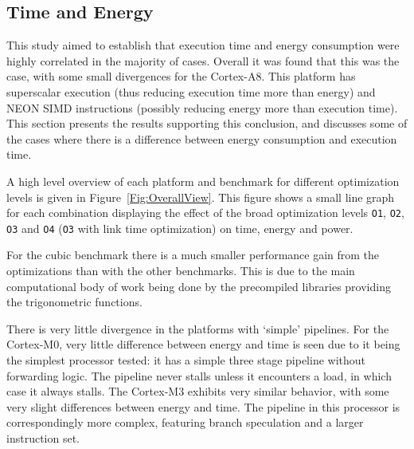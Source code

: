 \documentclass[twocolumn]{article}
\begin{document}
\subsection*{Time and Energy}

This study aimed to establish that execution time and energy consumption were highly correlated in the majority of cases. Overall it was found that this was the case, with some small divergences for the Cortex-A8. This platform has superscalar execution (thus reducing execution time more than energy) and NEON SIMD instructions (possibly reducing energy more than execution time). This section presents the results supporting this conclusion, and discusses some of the cases where there is a difference between energy consumption and execution time.

A high level overview of each platform and benchmark for different optimization levels is given in Figure~\ref{Fig:OverallView}. This figure shows a small line graph for each combination displaying the effect of the broad optimization levels \texttt{O1}, \texttt{O2}, \texttt{O3} and \texttt{O4} (\texttt{O3} with link time optimization) on time, energy and power.


For the cubic benchmark there is a much smaller performance gain from the optimizations than with the other benchmarks. This is due to the main computational body of work being done by the precompiled libraries providing the trigonometric functions.


There is very little divergence in the platforms with `simple' pipelines. For the Cortex-M0, very little difference between energy and time is seen due to it being the simplest processor tested: it has a simple three stage pipeline without forwarding logic. The pipeline never stalls unless it encounters a load, in which case it always stalls. The Cortex-M3 exhibits very similar behavior, with some very slight differences between energy and time. The pipeline in this processor is correspondingly more complex, featuring branch speculation and a larger instruction set\cite{Yiu2010}.
\end{document}
